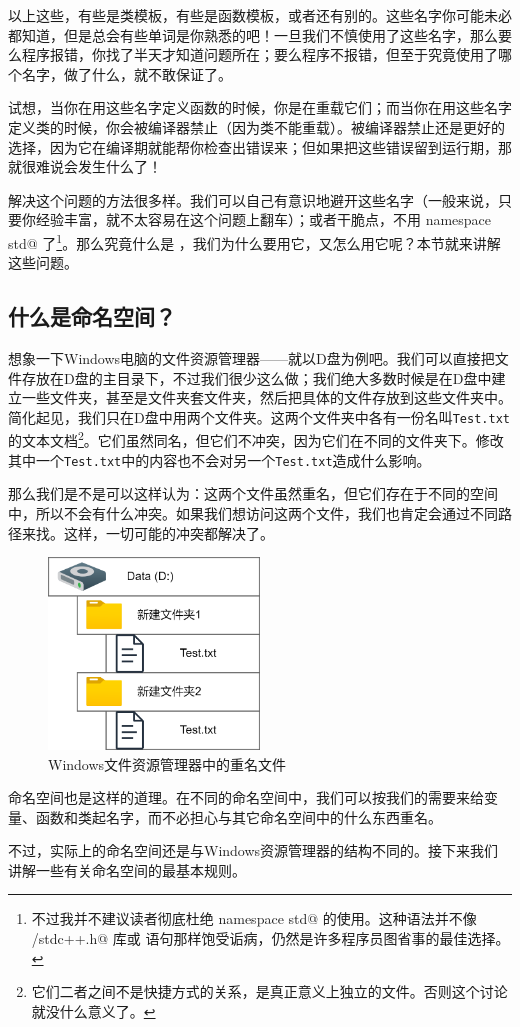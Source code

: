 以上这些，有些是类模板，有些是函数模板，或者还有别的。这些名字你可能未必都知道，但是总会有些单词是你熟悉的吧！一旦我们不慎使用了这些名字，那么要么程序报错，你找了半天才知道问题所在；要么程序不报错，但至于究竟使用了哪个名字，做了什么，就不敢保证了。\par
试想，当你在用这些名字定义函数的时候，你是在重载它们；而当你在用这些名字定义类的时候，你会被编译器禁止（因为类不能重载）。被编译器禁止还是更好的选择，因为它在编译期就能帮你检查出错误来；但如果把这些错误留到运行期，那就很难说会发生什么了！\par
解决这个问题的方法很多样。我们可以自己有意识地避开这些名字（一般来说，只要你经验丰富，就不太容易在这个问题上翻车）；或者干脆点，不用 \lstinline@using namespace std@ 了\footnote{不过我并不建议读者彻底杜绝 \lstinline@using namespace std@ 的使用。这种语法并不像 \lstinline@bits/stdc++.h@ 库或 \lstinline@goto@ 语句那样饱受诟病，仍然是许多程序员图省事的最佳选择。}。那么究竟什么是 \lstinline@namespace@，我们为什么要用它，又怎么用它呢？本节就来讲解这些问题。\par
\subsection*{什么是命名空间？}
想象一下Windows电脑的文件资源管理器——就以D盘为例吧。我们可以直接把文件存放在D盘的主目录下，不过我们很少这么做；我们绝大多数时候是在D盘中建立一些文件夹，甚至是文件夹套文件夹，然后把具体的文件存放到这些文件夹中。简化起见，我们只在D盘中用两个文件夹。这两个文件夹中各有一份名叫\texttt{Test.txt}的文本文档\footnote{它们二者之间不是快捷方式的关系，是真正意义上独立的文件。否则这个讨论就没什么意义了。}。它们虽然同名，但它们不冲突，因为它们在不同的文件夹下。修改其中一个\texttt{Test.txt}中的内容也不会对另一个\texttt{Test.txt}造成什么影响。\par
那么我们是不是可以这样认为：这两个文件虽然重名，但它们存在于不同的空间中，所以不会有什么冲突。如果我们想访问这两个文件，我们也肯定会通过不同路径来找。这样，一切可能的冲突都解决了。\par
\begin{figure}[htbp]
    \centering
    \includegraphics[width=0.5\textwidth]{../images/generalized_parts/07_file_explorer_and_namespaces.drawio.png}
    \caption{Windows文件资源管理器中的重名文件}
\end{figure}
命名空间也是这样的道理。在不同的命名空间中，我们可以按我们的需要来给变量、函数和类起名字，而不必担心与其它命名空间中的什么东西重名。\par
不过，实际上的命名空间还是与Windows资源管理器的结构不同的。接下来我们讲解一些有关命名空间的最基本规则。\par
